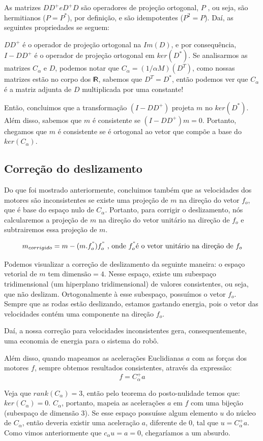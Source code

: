 \documentclass{article}
\def\bkRsf{{\sf \mbox{\vrule height0.705em width0.06em
            depth0em}\kern-.04em R}}
\begin{document}
As matrizes $DD^+ e D^+D$ são operadores de projeção ortogonal, $P$ , ou seja, são hermitianos ($P = P^*$), por definição, e são idempotentes ($P^2 = P$). Daí, as seguintes propriedades se seguem:

$DD^+$ é o operador de projeção ortogonal na $Im(D)$, e por consequência, $I - DD^+$ é o operador de projeção ortogonal em $ker(D^*)$.
Se analisarmos as matrizes $C_{\alpha}$ e $D$, podemos notar que $C_{\alpha} = (1/{\alpha}M)(D^T)$, como nossas matrizes estão no corpo dos $\bkRsf$, sabemos que $D^T = D^*$, então podemos ver que $C_{\alpha}$ é a matriz adjunta de $D$ multiplicada por uma constante!

Então, concluimos que a transformação $(I-DD^+)$ projeta $m$ no $ker(D^*)$. Além disso, sabemos que $m$ é consistente se $(I-DD^+)m = 0$. Portanto, chegamos que $m$ é consistente se é ortogonal ao vetor que compõe a base do $ker(C_{\alpha})$.

\subsection{Correção do deslizamento}

\hspace{1cm} Do que foi mostrado anteriormente, concluimos também que as velocidades dos motores são inconsistentes se existe uma projeção de $m$ na direção do vetor $f_{o}$, que é base do espaço nulo de $C_{\alpha}$. Portanto, para corrigir o deslizamento, nós calcularemos a projeção de $m$ na direção do vetor unitário na direção de $f_{o}$ e subtrairemos essa projeção de $m$.

\[m_{corrigido} = m - (m . f_{o}^")f_{o}^" \text{ ,  onde } f_{o}^" \text{é o vetor unitário na direção de }f_{o} \]

Podemos visualizar a correção de deslizamento da seguinte maneira: o espaço vetorial de $m$ tem $\text{dimensão}= 4$. Nesse espaço, existe um subespaço tridimensional (um hiperplano tridimensional) de valores consistentes, ou seja, que não deslizam. Ortogonalmente à esse subespaço, possuímos o vetor $f_{o}$. Sempre que as rodas estão deslizando, estamos gastando energia, pois o vetor das velocidades contém uma componente na direção $f_{o}$.

Daí, a nossa correção para velocidades inconsistentes gera, consequentemente, uma economia de energia para o sistema do robô.

Além disso, quando mapeamos as acelerações Euclidianas $a$ com as forças dos motores $f$, sempre obtemos resultados consistentes, através da expressão:
\[f = C_{\alpha}^+a\]

Veja que $rank(C_{\alpha}) = 3$, então pelo teorema do posto-nulidade temos que: $ker(C_{\alpha}) = 0$. $C_{\alpha}$, portanto, mapeia as acelerações $a$  em $f$ com uma bijeção (subespaço de dimensão 3). Se esse espaço possuísse algum elemento $u$ do núcleo de $C_{\alpha}$, então deveria existir uma aceleração $a$, diferente de 0, tal que $u = C_{\alpha}^+a$. Como vimos anteriormente que $c_ {\alpha}u = a = 0$, chegaríamos a um absurdo.
\end{document}
